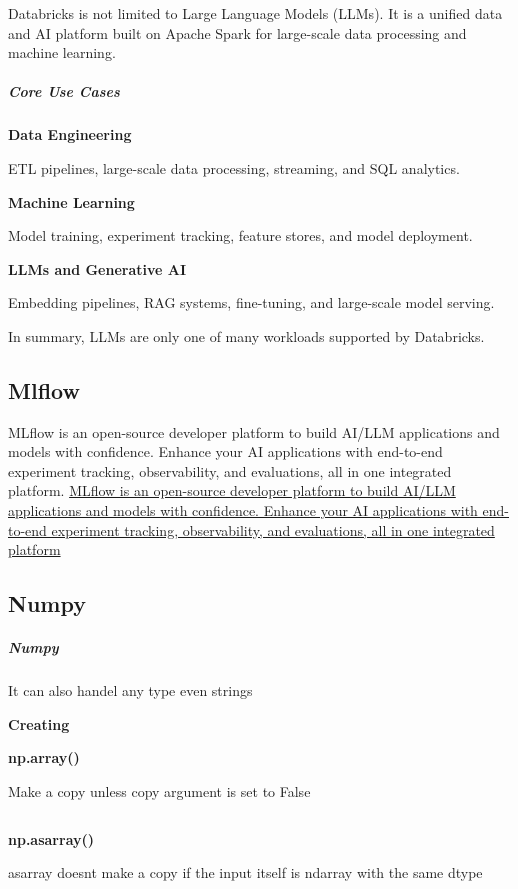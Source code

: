 \documentclass{book}
\providecommand{\ProjectDeepHeading}[2]{%
    \par\medskip\noindent\textbf{#2}\par\smallskip
}
\begin{document}

Databricks is not limited to Large Language Models (LLMs). It is a unified data and AI platform built on Apache Spark for large-scale data processing and machine learning.
    
    
    \subparagraph{Core Use Cases}
        
        \ProjectDeepHeading{1}{Data Engineering}
            ETL pipelines, large-scale data processing, streaming, and SQL analytics.
        
        \ProjectDeepHeading{1}{Machine Learning}
            Model training, experiment tracking, feature stores, and model deployment.
        
        \ProjectDeepHeading{1}{LLMs and Generative AI}
            Embedding pipelines, RAG systems, fine-tuning, and large-scale model serving.
            
            In summary, LLMs are only one of many workloads supported by Databricks.

\subsection{Mlflow}


MLflow is an open-source developer platform to build AI/LLM applications and models with confidence. Enhance your AI applications with end-to-end experiment tracking, observability, and evaluations, all in one integrated platform.
    \url{MLflow is an open-source developer platform to build AI/LLM applications and models with confidence. Enhance your AI applications with end-to-end experiment tracking, observability, and evaluations, all in one integrated platform}

\subsection{Numpy}


\subparagraph{Numpy}
    It can also handel any type even strings
    \ProjectDeepHeading{1}{Creating}
    \ProjectDeepHeading{3}{np.array()}
        Make a copy unless copy argument is set to False
        \begin{verbatim}
        \end{verbatim}
    \ProjectDeepHeading{3}{np.asarray()}
        asarray doesnt make a copy if the input itself is ndarray with the same dtype
\end{document}
